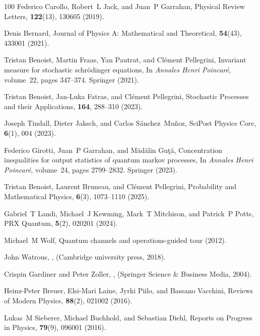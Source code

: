\documentclass[preprint,pteplogo]{ptephy_v2}%
\numberwithin{equation}{section}
\theoremstyle{definition}
\begin{document}
\begin{thebibliography}{100}
Federico Carollo, Robert~L Jack, and Juan~P Garrahan, Physical Review Letters, {\bf 122}(13), 130605 (2019).

Denis Bernard, Journal of Physics A: Mathematical and Theoretical, {\bf 54}(43), 433001 (2021).

Tristan Benoist, Martin Fraas, Yan Pautrat, and Cl{\'e}ment Pellegrini,
\newblock Invariant measure for stochastic schr{\"o}dinger equations,
\newblock In {\em Annales Henri Poincar{\'e}}, volume~22, pages 347--374. Springer (2021).

Tristan Benoist, Jan-Luka Fatras, and Cl{\'e}ment Pellegrini, Stochastic Processes and their Applications, {\bf 164}, 288--310 (2023).

Joseph Tindall, Dieter Jaksch, and Carlos S{\'a}nchez~Mu{\~n}oz, SciPost Physics Core, {\bf 6}(1), 004 (2023).

Federico Girotti, Juan~P Garrahan, and M{\u{a}}d{\u{a}}lin Gu{\c{t}}{\u{a}},
\newblock Concentration inequalities for output statistics of quantum markov processes,
\newblock In {\em Annales Henri Poincar{\'e}}, volume~24, pages 2799--2832. Springer (2023).

Tristan Benoist, Laurent Bruneau, and Cl{\'e}ment Pellegrini, Probability and Mathematical Physics, {\bf 6}(3), 1073--1110 (2025).

Gabriel~T Landi, Michael~J Kewming, Mark~T Mitchison, and Patrick~P Potts, PRX Quantum, {\bf 5}(2), 020201 (2024).

Michael~M Wolf,
\newblock Quantum channels and operations-guided tour (2012).

John Watrous,
,
\newblock  (Cambridge university press, 2018).

Crispin Gardiner and Peter Zoller,
,
\newblock  (Springer Science \& Business Media, 2004).

Heinz-Peter Breuer, Elsi-Mari Laine, Jyrki Piilo, and Bassano Vacchini, Reviews of Modern Physics, {\bf 88}(2), 021002 (2016).

Lukas~M Sieberer, Michael Buchhold, and Sebastian Diehl, Reports on Progress in Physics, {\bf 79}(9), 096001 (2016).


\end{thebibliography}
\end{document}
